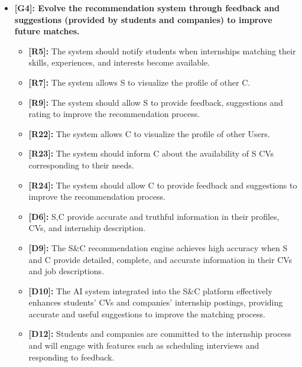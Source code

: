 \begin{itemize}
\item
  \textbf{[G4]: Evolve the recommendation system through feedback
  and suggestions (provided by students and companies) to improve future
  matches.}

  \begin{itemize}
  \item
    \textbf{[R5]:} The system should notify students when internships
    matching their skills, experiences, and interests become available.
  \item
    \textbf{[R7]:} The system allows S to visualize the profile of other C.
  \item
    \textbf{[R9]:} The system should allow S to provide feedback, suggestions
    and rating to improve the recommendation process.
  \item
    \textbf{[R22]:} The system allows C to visualize the profile of other
    Users.
  \item
    \textbf{[R23]:} The system should inform C about the availability of S
    CVs corresponding to their needs.
  \item
    \textbf{[R24]:} The system should allow C to provide feedback and
    suggestions to improve the recommendation process.
  \item
    \textbf{[D6]:} S,C provide accurate and truthful information in their
    profiles, CVs, and internship description.
  \item
    \textbf{[D9]:} The S\&C recommendation engine achieves high accuracy when
    S and C provide detailed, complete, and accurate information in
    their CVs and job descriptions.
  \item
    \textbf{[D10]:} The AI system integrated into the S\&C platform
    effectively enhances students' CVs and
    companies' internship postings, providing accurate
    and useful suggestions to improve the matching process.
  \item
    \textbf{[D12]:} Students and companies are committed to the internship
    process and will engage with features such as scheduling interviews
    and responding to feedback.
  \end{itemize}
\end{itemize}

